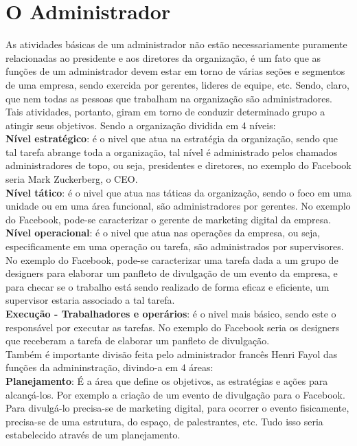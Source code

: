 \documentclass[14pt, oneside]{article}
\newcommand\tab[1][1cm]{\hspace*{#1}}
\theoremstyle{definition}
\begin{document}
            \section{O Administrador}
                \tab As atividades básicas de um administrador não estão necessariamente puramente relacionadas ao presidente e aos diretores da organização, é um fato que as funções de um administrador devem estar em torno de várias seções e segmentos de uma empresa, sendo exercida por gerentes, lideres de equipe, etc. Sendo, claro, que nem todas as pessoas que trabalham na organização são administradores. Tais atividades, portanto, giram em torno de conduzir determinado grupo a atingir seus objetivos. Sendo a organização dividida em 4 níveis: \\
                \tab \textbf{Nível estratégico}: é o nivel que atua na estratégia da organização, sendo que tal tarefa abrange toda a organização, tal nível é administrado pelos chamados administradores de topo, ou seja, presidentes e diretores, no exemplo do Facebook seria Mark Zuckerberg, o CEO. \\
                \tab \textbf{Nível tático}: é o nivel que atua nas táticas da organização, sendo o foco em uma unidade ou em uma área funcional, são administradores por gerentes. No exemplo do Facebook, pode-se caracterizar o gerente de marketing digital da empresa. \\
                \tab \textbf{Nível operacional}: é o nivel que atua nas operações da empresa, ou seja, especificamente em uma operação ou tarefa, são administrados por supervisores. No exemplo do Facebook, pode-se caracterizar uma tarefa dada a um grupo de designers para elaborar um panfleto de divulgação de um evento da empresa, e para checar se o trabalho está sendo realizado de forma eficaz e eficiente, um supervisor estaria associado a tal tarefa. \\
                \tab \textbf{Execução - Trabalhadores e operários}: é o nivel mais básico, sendo este o responsável por executar as tarefas. No exemplo do Facebook seria os designers que receberam a tarefa de elaborar um panfleto de divulgação. \\
                \tab Também é importante divisão feita pelo administrador francês Henri Fayol das funções da admininstração, divindo-a em 4 áreas: \\
                \tab \textbf{Planejamento}: É a área que define os objetivos, as estratégias e ações para alcançá-los. Por exemplo a criação de um evento de divulgação para o Facebook. Para divulgá-lo precisa-se de marketing digital, para ocorrer o evento fisicamente, precisa-se de uma estrutura, do espaço, de palestrantes, etc. Tudo isso seria estabelecido através de um planejamento. \\ 
\end{document}
